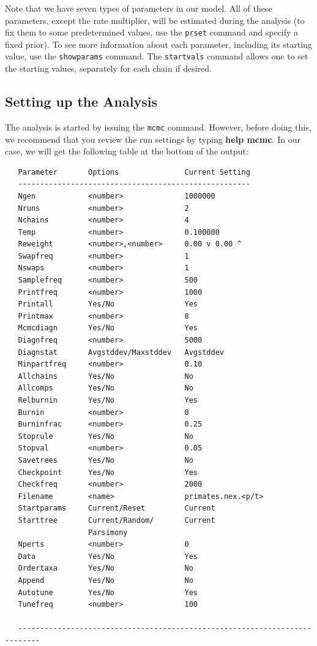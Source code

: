 \documentclass[12pt]{book}
\begin{document}
Note that we have seven types of parameters in our model. All of these parameters, except the rate multiplier,
 will be estimated during the analysis (to fix them to some predetermined values, use the \texttt{prset}
 command and specify a fixed prior). To see more information about each parameter, including its starting
 value, use the \texttt{showparams} command. The \texttt{startvals} command allows one to set the starting
 values, separately for each chain if desired.

\subsection{Setting up the Analysis}

The analysis is started by issuing the \texttt{mcmc} command. However, before doing this, we recommend that
 you review the run settings by typing \textbf{help mcmc}. In our case, we will get the following table at
 the bottom of the output:

\begin{singlespacing}
\footnotesize
\begin{verbatim}
   Parameter       Options               Current Setting
   -----------------------------------------------------
   Ngen            <number>              1000000
   Nruns           <number>              2
   Nchains         <number>              4
   Temp            <number>              0.100000
   Reweight        <number>,<number>     0.00 v 0.00 ^
   Swapfreq        <number>              1
   Nswaps          <number>              1
   Samplefreq      <number>              500
   Printfreq       <number>              1000
   Printall        Yes/No                Yes
   Printmax        <number>              8
   Mcmcdiagn       Yes/No                Yes
   Diagnfreq       <number>              5000
   Diagnstat       Avgstddev/Maxstddev   Avgstddev
   Minpartfreq     <number>              0.10
   Allchains       Yes/No                No
   Allcomps        Yes/No                No
   Relburnin       Yes/No                Yes
   Burnin          <number>              0
   Burninfrac      <number>              0.25
   Stoprule        Yes/No                No
   Stopval         <number>              0.05
   Savetrees       Yes/No                No
   Checkpoint      Yes/No                Yes
   Checkfreq       <number>              2000
   Filename        <name>                primates.nex.<p/t>
   Startparams     Current/Reset         Current
   Starttree       Current/Random/       Current
                   Parsimony
   Nperts          <number>              0
   Data            Yes/No                Yes
   Ordertaxa       Yes/No                No
   Append          Yes/No                No
   Autotune        Yes/No                Yes
   Tunefreq        <number>              100

   ---------------------------------------------------------------------------
\end{verbatim}
\normalsize
\end{singlespacing}
\end{document}
